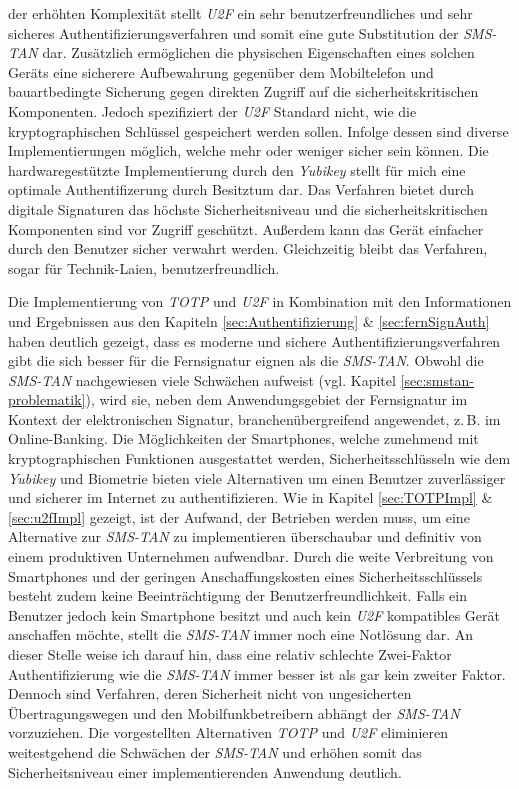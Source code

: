 \documentclass[11pt,a4paper,ngerman]{scrreprt}
\begin{document}
der erhöhten Komplexität stellt \textit{U2F} ein sehr benutzerfreundliches und sehr sicheres Authentifizierungsverfahren und somit eine gute Substitution der \textit{SMS-TAN} dar. Zusätzlich ermöglichen die physischen Eigenschaften eines solchen Geräts eine sicherere Aufbewahrung gegenüber dem Mobiltelefon und bauartbedingte Sicherung gegen direkten Zugriff auf die sicherheitskritischen Komponenten. Jedoch spezifiziert der \textit{U2F} Standard nicht, wie die kryptographischen Schlüssel gespeichert werden sollen. Infolge dessen sind diverse Implementierungen möglich, welche mehr oder weniger sicher sein können. Die hardwaregestützte Implementierung durch den \textit{Yubikey} stellt für mich eine optimale Authentifizerung durch Besitztum dar. Das Verfahren bietet durch digitale Signaturen das höchste Sicherheitsniveau und die sicherheitskritischen Komponenten sind vor Zugriff geschützt. Außerdem kann das Gerät einfacher durch den Benutzer sicher verwahrt werden. Gleichzeitig bleibt das Verfahren, sogar für Technik-Laien, benutzerfreundlich.

Die Implementierung von \textit{TOTP} und \textit{U2F} in Kombination mit den Informationen und Ergebnissen aus den Kapiteln \ref{sec:Authentifizierung} \& \ref{sec:fernSignAuth} haben deutlich gezeigt, dass es moderne und sichere Authentifizierungsverfahren gibt die sich besser für die Fernsignatur eignen als die \textit{SMS-TAN}. Obwohl die \textit{SMS-TAN} nachgewiesen viele Schwächen aufweist (vgl. Kapitel \ref{sec:smstan-problematik}), wird sie, neben dem Anwendungsgebiet der Fernsignatur im Kontext der elektronischen Signatur, branchenübergreifend angewendet, z.\,B. im Online-Banking. Die Möglichkeiten der Smartphones, welche zunehmend mit kryptographischen Funktionen ausgestattet werden, Sicherheitsschlüsseln wie dem \textit{Yubikey} und Biometrie bieten viele Alternativen um einen Benutzer zuverlässiger und sicherer im Internet zu authentifizieren. Wie in Kapitel \ref{sec:TOTPImpl} \& \ref{sec:u2fImpl} gezeigt, ist der Aufwand, der Betrieben werden muss, um eine Alternative zur \textit{SMS-TAN} zu implementieren überschaubar und definitiv von einem produktiven Unternehmen aufwendbar. Durch die weite Verbreitung von Smartphones und der geringen Anschaffungskosten eines Sicherheitsschlüssels besteht zudem keine Beeinträchtigung der Benutzerfreundlichkeit. Falls ein Benutzer jedoch kein Smartphone besitzt und auch kein \textit{U2F} kompatibles Gerät anschaffen möchte, stellt die \textit{SMS-TAN} immer noch eine Notlösung dar. An dieser Stelle weise ich darauf hin, dass eine relativ schlechte Zwei-Faktor Authentifizierung wie die \textit{SMS-TAN} immer besser ist als gar kein zweiter Faktor. Dennoch sind Verfahren, deren Sicherheit nicht von ungesicherten Übertragungswegen und den Mobilfunkbetreibern abhängt der \textit{SMS-TAN} vorzuziehen. Die vorgestellten Alternativen \textit{TOTP} und \textit{U2F} eliminieren weitestgehend die Schwächen der \textit{SMS-TAN} und erhöhen somit das Sicherheitsniveau einer implementierenden Anwendung deutlich.
\end{document}
